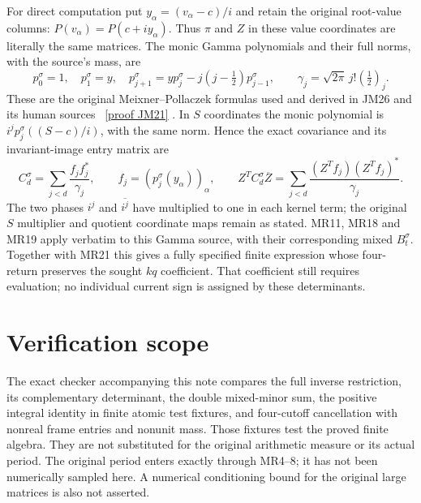 \documentclass[11pt]{article}
\begin{document}
For direct computation put
$y_\alpha=(v_\alpha-c)/i$ and retain the original root-value columns:
$P(v_\alpha)=P(c+iy_\alpha)$. Thus $\pi$ and $Z$ in these value
coordinates are literally the same matrices. The monic Gamma
polynomials and their full norms, with the source's mass, are
\[
 p_0^\sigma=1,\quad p_1^\sigma=y,\quad
 p_{j+1}^\sigma=yp_j^\sigma-j(j-\tfrac12)p_{j-1}^\sigma,
 \qquad\gamma_j=\sqrt{2\pi}\,j!(\tfrac12)_j.\tag{MR22}
\]
These are the original Meixner--Pollaczek formulas used and derived in
JM26 and its human sources \cite{mrroot:MP,mrroot:JM}%
~\href{https://github.com/KokunoYumeto/zeta-function-research-reader/blob/5992ad50c0f2a06921f1fcaded7b4e38097c0739/workbenches/splitzero-tandem/continuations/20260920-original-kernel-mixed-determinants/providers/JOINT_MINIMUM_RECEIVERS.tex\#L286}{[proof JM21]}%
{}. In $S$ coordinates the monic
polynomial is $i^jp_j^\sigma((S-c)/i)$, with the same norm. Hence the
exact covariance and its invariant-image entry matrix are
\[
 C_d^\sigma=\sum_{j<d}\frac{f_jf_j^*}{\gamma_j},\qquad
 f_j=(p_j^\sigma(y_\alpha))_\alpha,\qquad
 Z^TC_d^\sigma\overline Z
      =\sum_{j<d}\frac{(Z^Tf_j)(Z^Tf_j)^*}{\gamma_j}.\tag{MR23}
\]
The two phases $i^j$ and $\overline{i^j}$ have multiplied to one in
each kernel term; the original $S$ multiplier and quotient coordinate
maps remain as stated. MR11, MR18 and MR19 apply verbatim to this
Gamma source, with their corresponding mixed $B_t^\sigma$.
Together with MR21 this gives a fully specified finite expression
whose four-return preserves the sought $kq$ coefficient. That
coefficient still requires evaluation; no individual current sign is
assigned by these determinants.

\section{Verification scope}
The exact checker accompanying this note compares the full inverse
restriction, its complementary determinant, the double mixed-minor
sum, the positive integral identity in finite atomic test fixtures,
and four-cutoff cancellation with nonreal frame entries and nonunit
mass. Those fixtures test the proved finite algebra. They are not
substituted for the original arithmetic measure or its actual period.
The original period enters exactly through MR4--8; it has not been
numerically sampled here. A numerical conditioning bound for the
original large matrices is also not asserted.
\end{document}
